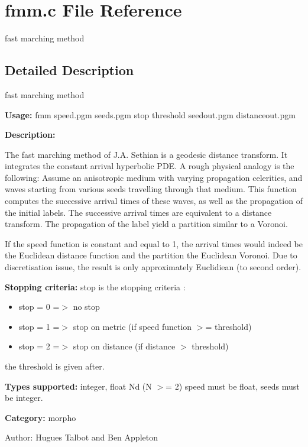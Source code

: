 \section{fmm.c File Reference}
\label{fmm_8c}
fast marching method 



\subsection{Detailed Description}
fast marching method 

{\bf Usage:} fmm speed.pgm seeds.pgm stop threshold seedout.pgm distanceout.pgm

{\bf Description:}

The fast marching method of J.A. Sethian is a geodesic distance transform. It integrates the constant arrival hyperbolic PDE. A rough physical analogy is the following: Assume an anisotropic medium with varying propagation celerities, and waves starting from various seeds travelling through that medium. This function computes the successive arrival times of these waves, as well as the propagation of the initial labels. The successive arrival times are equivalent to a distance transform. The propagation of the label yield a partition similar to a Voronoi.

If the speed function is constant and equal to 1, the arrival times would indeed be the Euclidean distance function and the partition the Euclidean Voronoi. Due to discretisation issue, the result is only approximately Euclidiean (to second order).

{\bf Stopping criteria:} stop is the stopping criteria :

\begin{itemize}
\item stop = 0 =$>$ no stop \item stop = 1 =$>$ stop on metric (if speed function $>$= threshold) \item stop = 2 =$>$ stop on distance (if distance $>$ threshold)\end{itemize}
the threshold is given after.

{\bf Types supported:} integer, float Nd (N $>$= 2) speed must be float, seeds must be integer.

{\bf Category:} morpho

\begin{Desc}
\item[Author:]Hugues Talbot and Ben Appleton \end{Desc}
